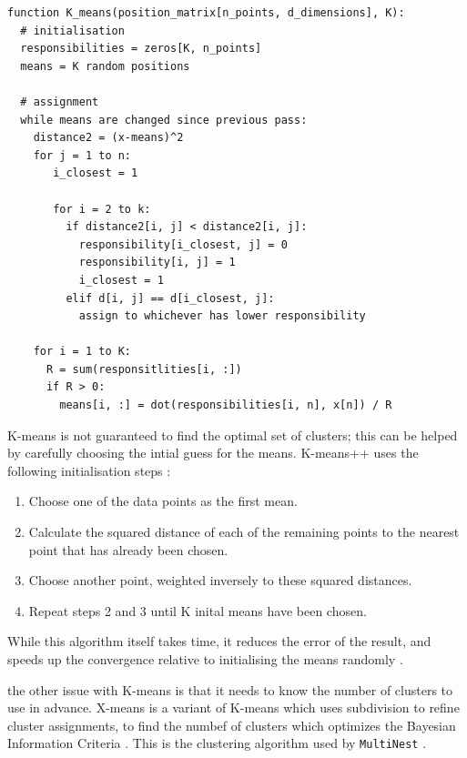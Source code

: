 \documentclass{article}
\begin{document}
\begin{verbatim}
function K_means(position_matrix[n_points, d_dimensions], K):
  # initialisation
  responsibilities = zeros[K, n_points]
  means = K random positions
  
  # assignment
  while means are changed since previous pass:
    distance2 = (x-means)^2
    for j = 1 to n:
       i_closest = 1
       
       for i = 2 to k:
         if distance2[i, j] < distance2[i, j]:
           responsibility[i_closest, j] = 0
           responsibility[i, j] = 1
           i_closest = 1
         elif d[i, j] == d[i_closest, j]:
           assign to whichever has lower responsibility
           
    for i = 1 to K:
      R = sum(responsitlities[i, :])
      if R > 0:
        means[i, :] = dot(responsibilities[i, n], x[n]) / R
\end{verbatim}
 
K-means is not guaranteed to find the optimal set of clusters; this can be helped by carefully choosing the intial guess for the means. K-means++ uses the following initialisation steps \cite{kmeans++}:
\begin{enumerate}
  \item Choose one of the data points as the first mean.
  \item Calculate the squared distance of each of the remaining points to the nearest point that has already been chosen.
  \item Choose another point, weighted inversely to these squared distances.
  \item Repeat steps 2 and 3 until K inital means have been chosen.
\end{enumerate}
While this algorithm itself takes time, it reduces the error of the result, and speeds up the convergence relative to initialising the means randomly \cite{kmeans++}.

the other issue with K-means is that it needs to know the number of clusters to use in advance. X-means is a variant of K-means which uses subdivision to refine cluster assignments, to find the numbef of clusters which optimizes the Bayesian Information Criteria \cite{bic}. This is the clustering algorithm used by \texttt{MultiNest} \cite{Feroz_2008}.
\end{document}
